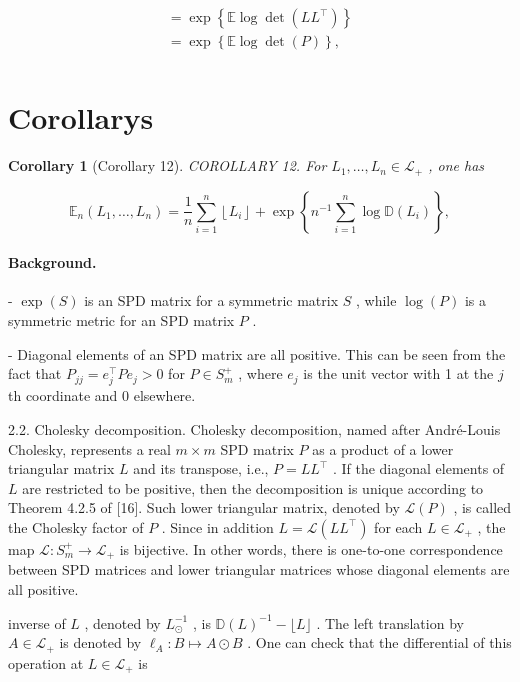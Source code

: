 \documentclass[11pt]{article}
\newtheorem{corollary}{Corollary}
\begin{document}
$$
\begin{array}{l} = \exp \left\{\mathbb {E} \log \det  (L L ^ {\top}) \right\} \\ = \exp \left\{\mathbb {E} \log \det  (P) \right\}, \\ \end{array}
$$


\section*{Corollarys}

\begin{corollary}[Corollary 12]
COROLLARY 12. For  $L_{1},\ldots ,L_{n}\in \mathcal{L}_{+}$  , one has

$$
\mathbb {E} _ {n} \left(L _ {1}, \dots , L _ {n}\right) = \frac {1}{n} \sum_ {i = 1} ^ {n} \left\lfloor L _ {i} \right\rfloor + \exp \left\{n ^ {- 1} \sum_ {i = 1} ^ {n} \log \mathbb {D} \left(L _ {i}\right) \right\}, \tag {4.3}
$$
\end{corollary}

\paragraph{Background.}
-  $\exp(S)$  is an SPD matrix for a symmetric matrix  $S$ , while  $\log(P)$  is a symmetric metric for an SPD matrix  $P$ .

- Diagonal elements of an SPD matrix are all positive. This can be seen from the fact that  $P_{jj} = e_j^\top Pe_j > 0$  for  $P \in S_m^+$ , where  $e_j$  is the unit vector with 1 at the  $j$ th coordinate and 0 elsewhere.

2.2. Cholesky decomposition. Cholesky decomposition, named after André-Louis Cholesky, represents a real  $m \times m$  SPD matrix  $P$  as a product of a lower triangular matrix  $L$  and its transpose, i.e.,  $P = LL^{\top}$ . If the diagonal elements of  $L$  are restricted to be positive, then the decomposition is unique according to Theorem 4.2.5 of [16]. Such lower triangular matrix, denoted by  $\mathcal{L}(P)$ , is called the Cholesky factor of  $P$ . Since in addition  $L = \mathcal{L}(LL^{\top})$  for each  $L \in \mathcal{L}_{+}$ , the map  $\mathcal{L}: S_{m}^{+} \to \mathcal{L}_{+}$  is bijective. In other words, there is one-to-one correspondence between SPD matrices and lower triangular matrices whose diagonal elements are all positive.

inverse of  $L$ , denoted by  $L_{\odot}^{-1}$ , is  $\mathbb{D}(L)^{-1} - \lfloor L\rfloor$ . The left translation by  $A\in \mathcal{L}_{+}$  is denoted by  $\ell_A:B\mapsto A\odot B$ . One can check that the differential of this operation at  $L\in \mathcal{L}_{+}$  is
\end{document}
